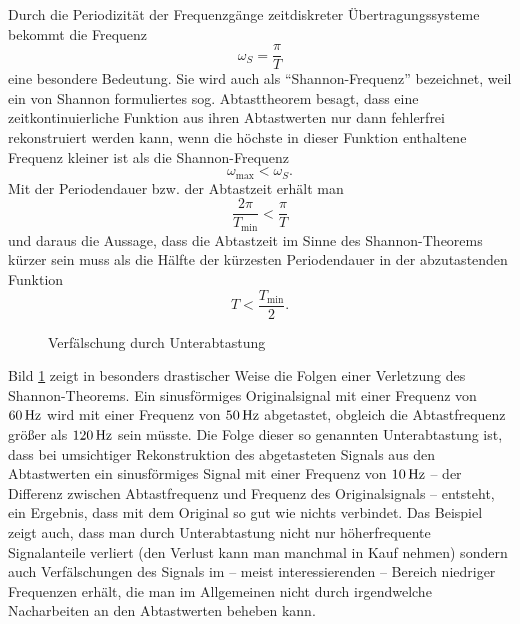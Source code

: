 Durch die Periodizität der Frequenzgänge zeitdiskreter Übertragungssysteme bekommt die Frequenz
\begin{equation}
	\omega_S = \frac{\pi}{T}
\end{equation}
eine besondere Bedeutung.
Sie wird auch als ``Shannon-Frequenz'' bezeichnet, weil ein von Shannon formuliertes sog. Abtasttheorem besagt, dass eine zeitkontinuierliche Funktion aus ihren Abtastwerten nur dann fehlerfrei rekonstruiert werden kann, wenn die höchste in dieser Funktion enthaltene Frequenz kleiner ist als die Shannon-Frequenz
\begin{equation}
	\omega_{\text{max}} < \omega_S.
\end{equation}
Mit der Periodendauer bzw. der Abtastzeit erhält man
\begin{equation}
	\frac{2\pi}{T_{\text{min}}} < \frac{\pi}{T}
\end{equation}
und daraus die Aussage, dass die Abtastzeit im Sinne des Shannon-Theorems kürzer sein muss als die Hälfte der kürzesten Periodendauer in der abzutastenden Funktion
\begin{equation}
	T < \frac{T_{\text{min}}}{2}.
\end{equation}
\begin{figure}[ht]
	\centering
	\caption{Verfälschung durch Unterabtastung}
	\label{fig:6-8}
\end{figure}
Bild \ref{fig:6-8} zeigt in besonders drastischer Weise die Folgen einer Verletzung des Shannon-Theorems.
Ein sinusförmiges Originalsignal mit einer Frequenz von \(60\,\si{\hertz}\) wird mit einer Frequenz von \(50\,\si{\hertz}\) abgetastet, obgleich die Abtastfrequenz größer als \(120\,\si{\hertz}\) sein müsste.
Die Folge dieser so genannten Unterabtastung ist, dass bei umsichtiger Rekonstruktion des abgetasteten Signals aus den Abtastwerten ein sinusförmiges Signal mit einer Frequenz von \(10\,\si{\hertz}\) -- der Differenz zwischen Abtastfrequenz und Frequenz des Originalsignals -- entsteht, ein Ergebnis, dass mit dem Original so gut wie nichts verbindet.
Das Beispiel zeigt auch, dass man durch Unterabtastung nicht nur höherfrequente Signalanteile verliert (den Verlust kann man manchmal in Kauf nehmen) sondern auch Verfälschungen des Signals im -- meist interessierenden -- Bereich niedriger Frequenzen erhält, die man im Allgemeinen nicht durch irgendwelche Nacharbeiten an den Abtastwerten beheben kann.

